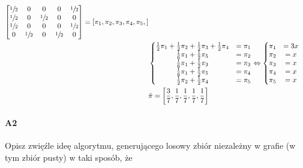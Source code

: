 \documentclass[a4paper,12pt]{article}
\theoremstyle{definition}%
\theoremstyle{definition}
\theoremstyle{problem}
\begin{document}
\begin{enumerate}[label=\alph*)]
\begin{enumerate}
\begin{align*}
\begin{bmatrix}
\sfrac{1}{2} & 0 & 0 & 0 & \sfrac{1}{2} \\
\sfrac{1}{2} & 0 & \sfrac{1}{2} & 0 & 0  \\
\sfrac{1}{2} & 0 & 0 & 0 & \sfrac{1}{2} \\
0 & \sfrac{1}{2} & 0 & \sfrac{1}{2} & 0 
\end{bmatrix}=\left[\pi _1,\pi _2,\pi _3,\pi _4,\pi _5,\right]\\
&\left\{\begin{matrix}
\frac{1}{2}\pi _1 + \frac{1}{2}\pi _2+ \frac{1}{2}\pi _3+ \frac{1}{2}\pi _4 &= \pi _1\\
\frac{1}{6}\pi _1 + \frac{1}{2}\pi _5 &= \pi _2\\
\frac{1}{6}\pi _1 + \frac{1}{2}\pi _3 &= \pi _3\\
\frac{1}{6}\pi _1 + \frac{1}{2}\pi _5 &= \pi_4 \\
\frac{1}{2}\pi _2+\frac{1}{2}\pi _4 &= \pi _5
\end{matrix}\right. \Leftrightarrow \left\{\begin{matrix}
\pi _1 &= 3x\\
\pi _2 &= x\\
\pi _3 &= x\\
\pi _4 &= x\\
\pi _5 &= x
\end{matrix}\right.\\
&\bar{\pi}=\left[\frac{3}{7},\frac{1}{7},\frac{1}{7},\frac{1}{7},\frac{1}{7}\right]
\end{align*}
\end{enumerate}
\end{enumerate}



\paragraph{A2} Opisz zwięźle ideę algorytmu, generującego losowy zbiór niezależny w grafie (w tym zbiór pusty) w taki sposób, że \label{par:10-A2}
\end{document}
